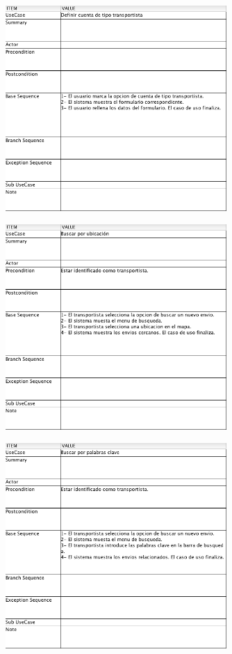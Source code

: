 \documentclass[10pt, a4paper,spanish]{article}
\begin{document}
		\begin{figure}[H]
			\centering
				\includegraphics[width=0.75\textwidth]{astah/use_case_definir_transportista.png}
		\end{figure}

		\begin{figure}[H]
			\centering
				\includegraphics[width=0.75\textwidth]{astah/use_case_buscar_ubicacion.png}
		\end{figure}

		\begin{figure}[H]
			\centering
				\includegraphics[width=0.75\textwidth]{astah/use_case_buscar_palabras_clave.png}
		\end{figure}
\end{document}
